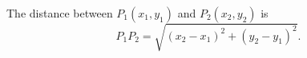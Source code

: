 \begin{theorem}\label{thm:distance-formula}
  The distance between $P_1(x_1, y_1)$ and $P_2(x_2, y_2)$ is
  \[
    P_1P_2 = \sqrt{(x_2 - x_1)^2 + (y_2 - y_1)^2}.
  \]
\end{theorem}

